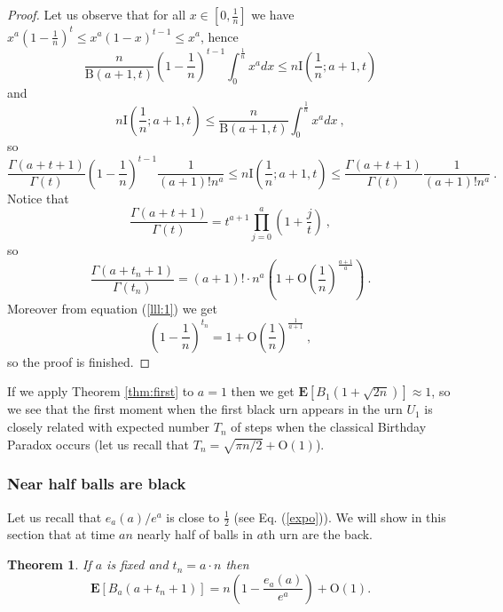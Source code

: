 \documentclass[submission]{dmtcs}
\newtheorem{theorem}{Theorem}
\newcommand{\E}[1]{\mathbf{E}\left[#1\right]}
\newcommand{\Beta}[2]{\mathrm{B}(#1,#2)}
\newcommand{\IBETAREGn}[2]{\mathrm{I}\left(\frac1n;#1,#2\right)}
\newcommand{\BigO}[1]{\mathrm{O}\left(#1\right)}
\begin{document}
\begin{proof} 
Let us observe that for all $x \in [0,\frac{1}{n}]$ we have
$x^a (1-\frac{1}{n})^t \leq x^a(1-x)^{t-1} \leq x^a$, 
hence
$$
  \frac{n}{\Beta{a+1}{t}}(1-\frac{1}{n})^{t-1} \int_{0}^{\frac1n}x^a dx \leq
  n \IBETAREGn{a+1}{t}
$$
and
$$
  n \IBETAREGn{a+1}{t} \leq
  \frac{n}{\Beta{a+1}{t}} \int_{0}^{\frac1n}x^a dx ~,
$$
so
$$
\frac{\Gamma(a+t+1)}{\Gamma(t)} (1-\frac{1}{n})^{t-1} \frac{1}{(a+1)!n^a} \leq
n \IBETAREGn{a+1}{t} \leq
\frac{\Gamma(a+t+1)}{\Gamma(t)} \frac{1}{(a+1)!n^a} ~.
$$
Notice that
$$
\frac{\Gamma(a+t+1)}{\Gamma(t)} = t^{a+1} \prod_{j=0}^{a}(1+\frac{j}{t})~,
$$
so 
$$
 \frac{\Gamma(a+t_n+1)}{\Gamma(t_n)} = 
 (a+1)!\cdot n^{a}\left(1+ \BigO{\frac{1}{n}}^{\frac{a+1}{a}}\right)~.
$$
Moreover from equation (\ref{lll:1}) we get
$$
\left(1-\frac1n\right)^{t_n}  = 1 + \BigO{\frac1n}^{\frac{1}{a+1}}~,
$$
so the proof is finished.
\end{proof}

If we apply Theorem \ref{thm:first} to $a=1$ then we get
$\E{B_1(1+\sqrt{2n})} \approx 1$, so we see that the first moment when the first 
black urn appears in the urn $U_1$ is closely related with expected number $T_n$
of steps when the classical Birthday Paradox occurs (let us recall that 
$T_n = \sqrt{\pi n/2} + \BigO{1}$).

\subsubsection{Near half balls are black}

Let us recall that $e_a(a)/{e^a}$ is close to $\frac12$ (see Eq. (\ref{expo})). 
We will show in this section that at time $an$ nearly half of balls 
in $a$th urn are the back.

\begin{theorem}\label{thm7xc}
If $a$ is fixed and $t_n = a\cdot n$ then
$$
  \E{B_{a}(a+t_n+1)} = n\left(1-\frac{e_a(a)}{e^a}\right) + \BigO{1}.
$$
\end{theorem}
\end{document}
